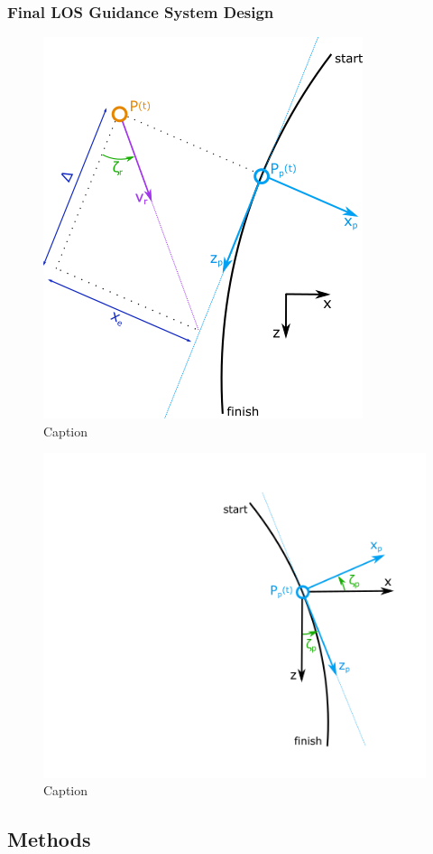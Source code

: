 \subsubsection{Final LOS Guidance System Design}

\begin{figure} [H]
    \centering
    \includegraphics[width=0.6\linewidth]{images/inkscape/pathframe.png}
    \caption{Caption}
    \label{fig:enter-label}
\end{figure}

\begin{figure} [H]
    \centering
    \includegraphics[width=0.5\linewidth]{images/inkscape/pathframeRotation.png}
    \caption{Caption}
    \label{fig:enter-label}
\end{figure}



\subsection{Methods}

